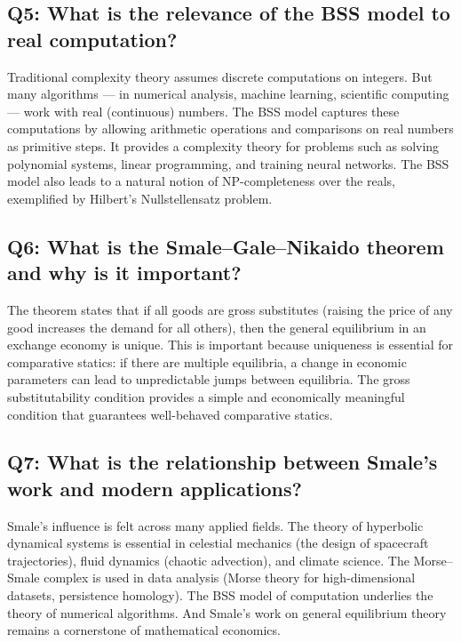 \subsection*{Q5: What is the relevance of the BSS model to real computation?}

Traditional complexity theory assumes discrete computations on integers. But many algorithms --- in numerical analysis, machine learning, scientific computing --- work with real (continuous) numbers. The BSS model captures these computations by allowing arithmetic operations and comparisons on real numbers as primitive steps. It provides a complexity theory for problems such as solving polynomial systems, linear programming, and training neural networks. The BSS model also leads to a natural notion of NP-completeness over the reals, exemplified by Hilbert's Nullstellensatz problem.

\subsection*{Q6: What is the Smale--Gale--Nikaido theorem and why is it important?}

The theorem states that if all goods are gross substitutes (raising the price of any good increases the demand for all others), then the general equilibrium in an exchange economy is unique. This is important because uniqueness is essential for comparative statics: if there are multiple equilibria, a change in economic parameters can lead to unpredictable jumps between equilibria. The gross substitutability condition provides a simple and economically meaningful condition that guarantees well-behaved comparative statics.

\subsection*{Q7: What is the relationship between Smale's work and modern applications?}

Smale's influence is felt across many applied fields. The theory of hyperbolic dynamical systems is essential in celestial mechanics (the design of spacecraft trajectories), fluid dynamics (chaotic advection), and climate science. The Morse--Smale complex is used in data analysis (Morse theory for high-dimensional datasets, persistence homology). The BSS model of computation underlies the theory of numerical algorithms. And Smale's work on general equilibrium theory remains a cornerstone of mathematical economics.

